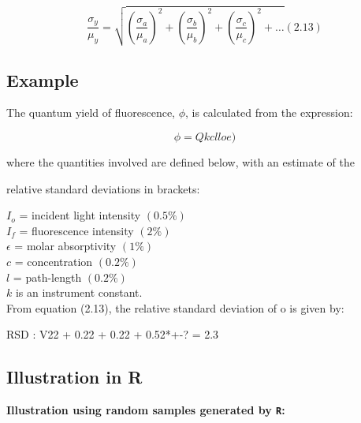  

\[ \frac{\sigma_y}{\mu_y} = \sqrt{(\frac{\sigma_a}{\mu_a})^2 + (\frac{\sigma_b}{\mu_b})^2 + (\frac{\sigma_c}{\mu_c})^2 + \ldots} (2.13)\]

 

\subsection{Example}

 

The quantum yield of fluorescence, $\phi$, is calculated from the expression:

\[\phi = Qkclloe)\]

where the quantities involved are defined below, with an estimate of the

relative standard deviations in brackets:

 

$I_o$ = incident light intensity $(0.5\%)$\\

$I_f$ = fluorescence intensity $(2\%)$\\

$\epsilon$ = molar absorptivity $(1\%)$\\

$c$ = concentration $(0.2\%)$\\

$l$ = path-length $(0.2\%)$\\

$k$ is an instrument constant.\\

From equation (2.13), the relative standard deviation of o is given by:

RSD : V22 + 0.22 + 0.22 + 0.52*+-? = 2.3%

 

\subsection{Illustration in R}

 

\textbf{Illustration using random samples generated by \texttt{R}:}

 


